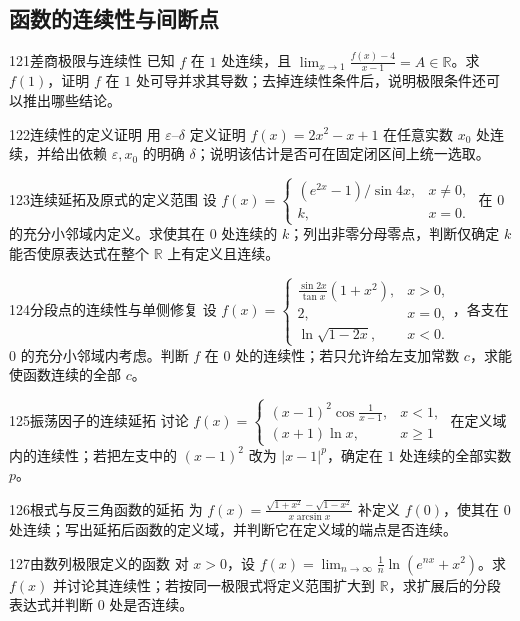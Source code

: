 \subsection{函数的连续性与间断点}
\begin{exercise}{121}{差商极限与连续性}
已知 $f$ 在 $1$ 处连续，且 $\lim_{x\to1}\frac{f(x)-4}{x-1}=A\in\mathbb R$。求 $f(1)$，证明 $f$ 在 $1$ 处可导并求其导数；去掉连续性条件后，说明极限条件还可以推出哪些结论。
\end{exercise}
\begin{exercise}{122}{连续性的定义证明}
用 $\varepsilon$--$\delta$ 定义证明 $f(x)=2x^2-x+1$ 在任意实数 $x_0$ 处连续，并给出依赖 $\varepsilon,x_0$ 的明确 $\delta$；说明该估计是否可在固定闭区间上统一选取。
\end{exercise}
\begin{exercise}{123}{连续延拓及原式的定义范围}
设 $f(x)=\begin{cases}(e^{2x}-1)/\sin4x,&x\ne0,\\k,&x=0.\end{cases}$ 在 $0$ 的充分小邻域内定义。求使其在 $0$ 处连续的 $k$；列出非零分母零点，判断仅确定 $k$ 能否使原表达式在整个 $\mathbb R$ 上有定义且连续。
\end{exercise}
\begin{exercise}{124}{分段点的连续性与单侧修复}
设 $f(x)=\begin{cases}\frac{\sin2x}{\tan x}(1+x^2),&x>0,\\2,&x=0,\\\ln\sqrt{1-2x},&x<0.\end{cases}$，各支在 $0$ 的充分小邻域内考虑。判断 $f$ 在 $0$ 处的连续性；若只允许给左支加常数 $c$，求能使函数连续的全部 $c$。
\end{exercise}
\begin{exercise}{125}{振荡因子的连续延拓}
讨论 $f(x)=\begin{cases}(x-1)^2\cos\frac1{x-1},&x<1,\\(x+1)\ln x,&x\ge1\end{cases}$ 在定义域内的连续性；若把左支中的 $(x-1)^2$ 改为 $|x-1|^p$，确定在 $1$ 处连续的全部实数 $p$。
\end{exercise}
\begin{exercise}{126}{根式与反三角函数的延拓}
为 $f(x)=\frac{\sqrt{1+x^2}-\sqrt{1-x^2}}{x\arcsin x}$ 补定义 $f(0)$，使其在 $0$ 处连续；写出延拓后函数的定义域，并判断它在定义域的端点是否连续。
\end{exercise}
\begin{exercise}{127}{由数列极限定义的函数}
对 $x>0$，设 $f(x)=\lim_{n\to\infty}\frac1n\ln(e^{nx}+x^2)$。求 $f(x)$ 并讨论其连续性；若按同一极限式将定义范围扩大到 $\mathbb R$，求扩展后的分段表达式并判断 $0$ 处是否连续。
\end{exercise}
